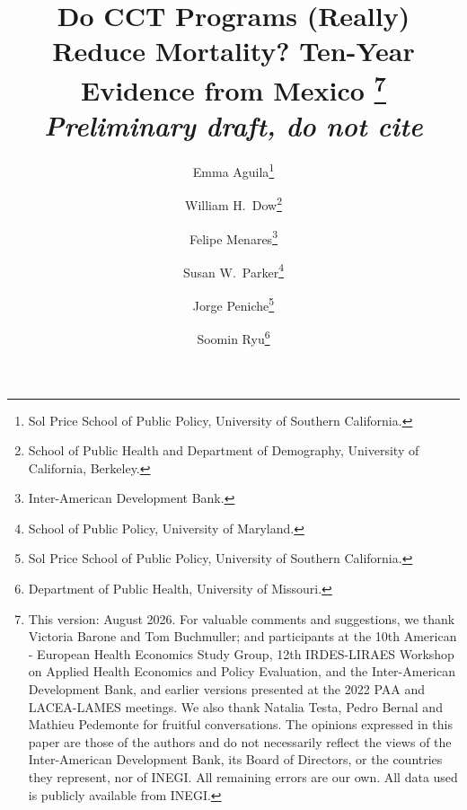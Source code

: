 \documentclass[12pt]{article}
\begin{document}


\title{\Large{Do CCT Programs (Really) Reduce Mortality? Ten-Year Evidence from Mexico}
\thanks{This version: August 2026. For valuable comments and suggestions, we thank Victoria Barone and Tom Buchmuller; and participants at the 10th American - European Health Economics Study Group, 12th IRDES-LIRAES Workshop on Applied Health Economics and Policy Evaluation, and the Inter-American Development Bank, and earlier versions presented at the 2022 PAA and LACEA-LAMES meetings. We also thank
Natalia Testa, Pedro Bernal and Mathieu Pedemonte for fruitful conversations. The opinions expressed in this paper are those of the authors and do not necessarily reflect the views of the Inter-American Development Bank, its Board of Directors, or the countries they represent, nor of INEGI. All remaining errors are our own. All data used is publicly available from INEGI.}\\ \textit{Preliminary draft, do not cite}}

\author{Emma Aguila\footnote{Sol Price School of Public Policy, University of Southern California.}
\and William H.\ Dow\footnote{School of Public Health and Department of Demography, University of California, Berkeley.}
\and Felipe Menares\footnote{Inter-American Development Bank.}
\and Susan W.\ Parker\footnote{School of Public Policy, University of Maryland.}
\and Jorge Peniche\footnote{Sol Price School of Public Policy, University of Southern California.}
\and Soomin Ryu\footnote{Department of Public Health, University of Missouri.}}

\date{}
\maketitle
\vspace{-12mm}
\thispagestyle{empty}

\end{document}
